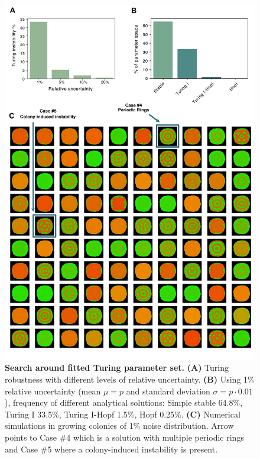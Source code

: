 \begin{figure}[H] %
    \centering
    \begin{adjustbox}{center}
        \includegraphics[width=1\textwidth]{chapters/Chapter 3/turing_fit_noise_robustness} %
    \end{adjustbox}
    \caption{\textbf{Search around fitted Turing parameter set.} \textbf{(A)} Turing robustness with different levels of relative uncertainty. \textbf{(B)} Using 1\% relative uncertainty (mean $\mu=p$ and standard deviation $\sigma=p\cdot 0.01$), frequency of different analytical solutions: Simple stable 64.8\%, Turing I 33.5\%, Turing I-Hopf 1.5\%, Hopf 0.25\%. \textbf{(C)} Numerical simulations in growing colonies of 1\% noise distribution. Arrow points to Case \#4 which is a solution with multiple periodic rings and Case \#5 where a colony-induced instability is present.}
    \label{fig:turing_fit_noise_robustness}
\end{figure}

